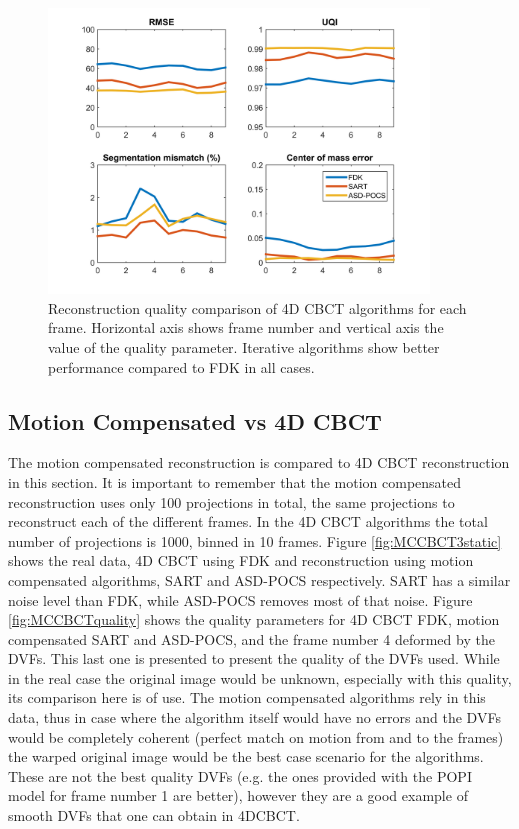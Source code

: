 \begin{figure}
\begin{center}

\includegraphics[width=0.9\textwidth]{accuracyMC/4DCBCTparams.png} 


\end{center}

\caption[Reconstruction quality comparison of 4D CBCT algorithms]{\label{fig:4dCBCTquality} Reconstruction quality comparison of 4D CBCT algorithms for each frame. Horizontal axis shows frame number and vertical axis the value of the quality parameter. Iterative algorithms show better performance compared to FDK in all cases.} 
\end{figure}

\subsection{Motion Compensated vs 4D CBCT}

The motion compensated reconstruction is compared to 4D CBCT reconstruction in this section. It is important to remember that the motion compensated reconstruction uses only 100 projections in total, the same projections to reconstruct each of the different frames. In the 4D CBCT algorithms the total number of projections is 1000, binned in 10 frames. Figure \ref{fig:MCCBCT3static} shows the real data, 4D CBCT using FDK and reconstruction using motion compensated algorithms, SART and ASD-POCS respectively. SART has a similar noise level than FDK, while ASD-POCS removes most of that noise. Figure \ref{fig:MCCBCTquality} shows the quality parameters for 4D CBCT FDK, motion compensated SART and ASD-POCS, and the frame number 4 deformed by the DVFs. This last one is presented to present the quality of the DVFs used. While in the real case the original image would be unknown, especially with this quality, its comparison here is of use. The motion compensated algorithms rely in this data, thus in case where the algorithm itself would have no errors and the DVFs would be completely coherent (perfect match on motion from and to the frames) the warped original image would be the best case scenario for the algorithms. These are not the best quality DVFs (e.g. the ones provided with the POPI model for frame number 1 are better), however they are a good example of smooth DVFs that one can obtain in 4DCBCT.

